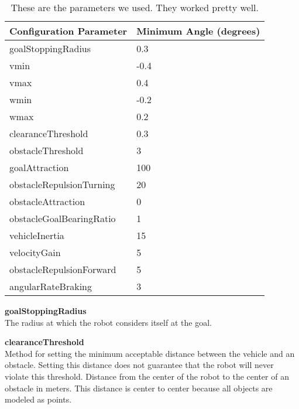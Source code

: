 \begin{table}
  \centering
  \begin{tabularx}{0.65 \textwidth}{|X||X|}
    \hline
    \textbf{Configuration Parameter}  & \textbf{Minimum Angle (degrees)}\\  \hline\hline
    goalStoppingRadius        &   0.3   \\  \hline
    vmin                      &   -0.4  \\  \hline
    vmax                      &   0.4   \\  \hline
    wmin                      &  -0.2   \\  \hline
    wmax                      &   0.2   \\  \hline
    clearanceThreshold        &   0.3   \\  \hline
    obstacleThreshold         &   3     \\  \hline
    goalAttraction            &   100   \\  \hline
    obstacleRepulsionTurning  &   20    \\  \hline
    obstacleAttraction        &   0     \\  \hline
    obstacleGoalBearingRatio  &   1     \\  \hline
    vehicleInertia            &   15    \\  \hline
    velocityGain              &   5     \\  \hline
    obstacleRepulsionForward  &   5     \\  \hline
    angularRateBraking        &   3     \\  \hline
  \end{tabularx} 
  
  \caption{These are the parameters we used. They worked pretty well.}
  \label{tab:nav_params1}
\end{table}

\textbf{goalStoppingRadius}        \\
The radius at which the robot considers itself at the goal.

\textbf{clearanceThreshold} \\
Method for setting the minimum acceptable distance between the vehicle and an obstacle.
Setting this distance does not guarantee that the robot will never violate this threshold.
Distance from the center of the robot to the center of an obstacle in meters. 
This distance is center to center because all objects are modeled as points. \\

